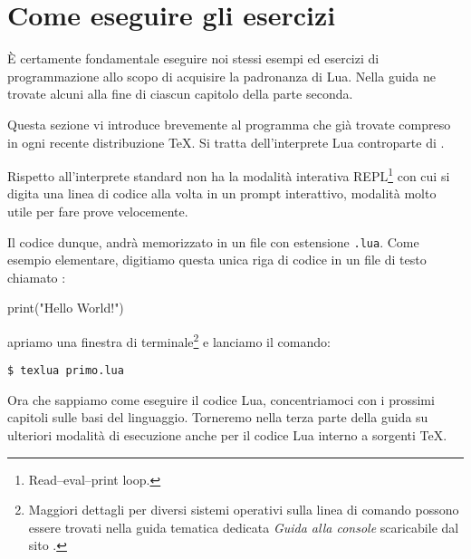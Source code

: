 

\chapter{Come eseguire gli esercizi}

È certamente fondamentale eseguire noi stessi esempi ed esercizi di
programmazione allo scopo di acquisire la padronanza di Lua. Nella guida ne
trovate alcuni alla fine di ciascun capitolo della parte seconda. 

Questa sezione vi introduce brevemente al programma  che già
trovate compreso in ogni recente distribuzione \TeX{}. Si tratta dell'interprete
Lua controparte di .

Rispetto all'interprete  standard  non ha la modalità
interativa REPL\footnote{Read–eval–print loop.} con cui si digita una linea di
codice alla volta in un prompt interattivo, modalità molto utile per fare prove
velocemente.

Il codice dunque, andrà memorizzato in un file con estensione \texttt{.lua}.
Come esempio elementare, digitiamo questa unica riga di codice in un file
di testo chiamato :
\begin{lines}
print("Hello World!")
\end{lines}
apriamo una finestra di terminale\footnote{Maggiori dettagli per diversi sistemi
operativi sulla linea di comando possono essere trovati nella guida tematica
dedicata \emph{Guida alla console} scaricabile dal sito \GuIT.} e lanciamo il
comando:
\begin{Verbatim}[numbers=none,xleftmargin=0pt]
$ texlua primo.lua
\end{Verbatim}

Ora che sappiamo come eseguire il codice Lua, concentriamoci con i prossimi
capitoli sulle basi del linguaggio. Torneremo nella terza parte della guida su
ulteriori modalità di esecuzione anche per il codice Lua interno a sorgenti
\TeX.


